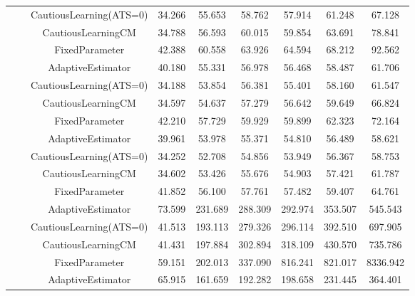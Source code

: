 \begin{table}[!h]
\begin{tabular}[t]{ccccccccc}
 &  & CautiousLearning(ATS=0) & 34.266 & 55.653 & 58.762 & 57.914 & 61.248 & 67.128\\

 &  & CautiousLearningCM & 34.788 & 56.593 & 60.015 & 59.854 & 63.691 & 78.841\\

 & \multirow[t]{-4}{*}{\centering\arraybackslash 1.00} & FixedParameter & 42.388 & 60.558 & 63.926 & 64.594 & 68.212 & 92.562\\
\cmidrule{2-9}
 &  & AdaptiveEstimator & 40.180 & 55.331 & 56.978 & 56.468 & 58.487 & 61.706\\

 &  & CautiousLearning(ATS=0) & 34.188 & 53.854 & 56.381 & 55.401 & 58.160 & 61.547\\

 &  & CautiousLearningCM & 34.597 & 54.637 & 57.279 & 56.642 & 59.649 & 66.824\\

 & \multirow[t]{-4}{*}{\centering\arraybackslash 1.25} & FixedParameter & 42.210 & 57.729 & 59.929 & 59.899 & 62.323 & 72.164\\
\cmidrule{2-9}
 &  & AdaptiveEstimator & 39.961 & 53.978 & 55.371 & 54.810 & 56.489 & 58.621\\

 &  & CautiousLearning(ATS=0) & 34.252 & 52.708 & 54.856 & 53.949 & 56.367 & 58.753\\

 &  & CautiousLearningCM & 34.602 & 53.426 & 55.676 & 54.903 & 57.421 & 61.787\\

\multirow[t]{-28}{*}{\centering\arraybackslash 50} & \multirow[t]{-4}{*}{\centering\arraybackslash 1.50} & FixedParameter & 41.852 & 56.100 & 57.761 & 57.482 & 59.407 & 64.761\\
\cmidrule{1-9}
 &  & AdaptiveEstimator & 73.599 & 231.689 & 288.309 & 292.974 & 353.507 & 545.543\\

 &  & CautiousLearning(ATS=0) & 41.513 & 193.113 & 279.326 & 296.114 & 392.510 & 697.905\\

 &  & CautiousLearningCM & 41.431 & 197.884 & 302.894 & 318.109 & 430.570 & 735.786\\

 & \multirow[t]{-4}{*}{\centering\arraybackslash 0.25} & FixedParameter & 59.151 & 202.013 & 337.090 & 816.241 & 821.017 & 8336.942\\
\cmidrule{2-9}
 &  & AdaptiveEstimator & 65.915 & 161.659 & 192.282 & 198.658 & 231.445 & 364.401\\


\end{tabular}
\end{table}

